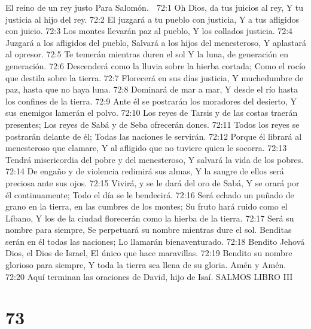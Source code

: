 El reino de un rey justo 
Para Salomón. 

72:1 Oh Dios, da tus juicios al rey, 
Y tu justicia al hijo del rey. 
72:2 El juzgará a tu pueblo con justicia, 
Y a tus afligidos con juicio. 
72:3 Los montes llevarán paz al pueblo, 
Y los collados justicia. 
72:4 Juzgará a los afligidos del pueblo, 
Salvará a los hijos del menesteroso, 
Y aplastará al opresor. 
72:5 Te temerán mientras duren el sol 
Y la luna, de generación en generación. 
72:6 Descenderá como la lluvia sobre la hierba cortada; 
Como el rocío que destila sobre la tierra. 
72:7 Florecerá en sus días justicia, 
Y muchedumbre de paz, hasta que no haya luna. 
72:8 Dominará de mar a mar, 
Y desde el río hasta los confines de la tierra.  
72:9 Ante él se postrarán los moradores del desierto, 
Y sus enemigos lamerán el polvo. 
72:10 Los reyes de Tarsis y de las costas traerán presentes; 
Los reyes de Sabá y de Seba ofrecerán dones. 
72:11 Todos los reyes se postrarán delante de él; 
Todas las naciones le servirán. 
72:12 Porque él librará al menesteroso que clamare, 
Y al afligido que no tuviere quien le socorra. 
72:13 Tendrá misericordia del pobre y del menesteroso, 
Y salvará la vida de los pobres. 
72:14 De engaño y de violencia redimirá sus almas, 
Y la sangre de ellos será preciosa ante sus ojos. 
72:15 Vivirá, y se le dará del oro de Sabá, 
Y se orará por él continuamente; 
Todo el día se le bendecirá. 
72:16 Será echado un puñado de grano en la tierra, en las cumbres de los montes; 
Su fruto hará ruido como el Líbano, 
Y los de la ciudad florecerán como la hierba de la tierra. 
72:17 Será su nombre para siempre, 
Se perpetuará su nombre mientras dure el sol. 
Benditas serán en él todas las naciones; 
Lo llamarán bienaventurado. 
72:18 Bendito Jehová Dios, el Dios de Israel, 
El único que hace maravillas. 
72:19 Bendito su nombre glorioso para siempre, 
Y toda la tierra sea llena de su gloria. 
Amén y Amén. 
72:20 Aquí terminan las oraciones de David, hijo de Isaí.
SALMOS 
LIBRO III

\chapter{73}

